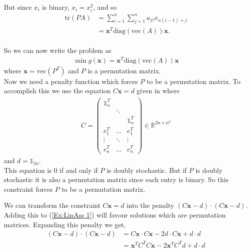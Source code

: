 \documentclass{article}
\begin{document}
But since \(x_i\) is binary, \(x_i = x_i^2\), and so 
\begin{align*}
    \text{tr}(PA) &= \sum_{i=1}^{n} \sum_{j=1}^{n} a_{ji}x_{n(i-1)+j} \\
    &= \mathbf{x}^T \text{diag}(\text{vec}(A))\mathbf{x}.
\end{align*}\\
\noindent So we can now write the problem as 
\begin{align} \label{Ex:LinAss 1}
    \min g(\mathbf{x}) = \mathbf{x}^T \text{diag}(\text{vec}(A)) \mathbf{x}
\end{align}
where \(\mathbf{x} = \text{vec}(P^T)\) and \(P\) is a permutation matrix.\\

\noindent Now we need a penalty function which forces \(P\) to be a permutation matrix. To accomplish this we use the equation \(C\mathbf{x} = d\) given in \cite[p.~8]{klus2023continuous} where 
\begin{align*}
    C = \begin{pmatrix}
        \mathbb{1}_n^T & & \\
         & \ddots & \\ 
         & & \mathbb{1}_n^T \\
         e_1^T & \hdots & e_1^T \\
         \vdots & \ddots & \vdots \\
         e_n^T & \hdots & e_n^T
    \end{pmatrix} \in \mathbb{R}^{2n \times n^2}
\end{align*}
and \(d = \mathbb{1}_{2n}\). \\
This equation is 0 if and only if \(P\) is doubly stochastic. But if \(P\) is doubly stochastic it is also a permutation matrix since each entry is binary. So this constraint forces \(P\) to be a permutation matrix.

\newpage
\noindent We can transform the constraint \(C\mathbf{x} = d\) into the penalty \((C\mathbf{x} - d) \cdot (C\mathbf{x} - d)\). Adding this to (\ref{Ex:LinAss 1}) will favour solutions which are  permutation matrices.
Expanding this penalty we get,
\begin{align*}
    (C\mathbf{x} - d) \cdot (C\mathbf{x} - d) &= C\mathbf{x} \cdot C\mathbf{x} - 2d\cdot C\mathbf{x} + d \cdot d \\
    &= \mathbf{x}^T C^T C \mathbf{x} -2\mathbf{x}^T C^T d + d\cdot d
\end{align*}
\end{document}
